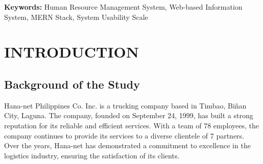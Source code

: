 \documentclass[journal]{./IEEE/IEEEtran}
\title{\SPTITLE}
\author{\ADVISEE~and~\ADVISER%
\REMARK
}
\begin{document}
\maketitle

\begin{abstract}
    This study addresses the challenges faced by Hana-net Philippines Co. Inc., a trucking company based in Biñan, Laguna, transitioning from traditional human resource management methods to a modern, web-based information system. The company, with 78 employees servicing 7 partners, has relied on pen-and-paper records and Excel spreadsheets for HR functions since 1999, which is prone to data insecurity and inefficiencies. This research details the development of a web-based employee information system using the MERN stack (MongoDB, Express.js, React.js, Node.js) to centralize employee data management, streamline payroll processing, automate leave applications, and enhance overall HR operations. System evaluation using Brooke's System Usability Scale (SUS) with ten company employees resulted in a mean score of 76.75, indicating good usability. User feedback highlighted areas for frontend interface improvements while confirming the system's effectiveness in addressing the limitations of manual processes. The successful implementation demonstrates how small businesses in the logistics industry like Hana-net can benefit from tailored information systems.

\end{abstract}
\textbf{Keywords:} Human Resource Management System, Web-based Information System, MERN Stack, System Usability Scale
\section{\textbf{INTRODUCTION}}

\subsection{\textbf{Background of the Study}}
Hana-net Philippines Co. Inc. is a trucking company based in Timbao, Biñan City, Laguna. The company, founded on September 24, 1999, has built a strong reputation for its reliable and efficient services. With a team of 78 employees, the company continues to provide its services to a diverse clientele of 7 partners. Over the years, Hana-net has demonstrated a commitment to excellence in the logistics industry, ensuring the satisfaction of its clients.
\end{document}

